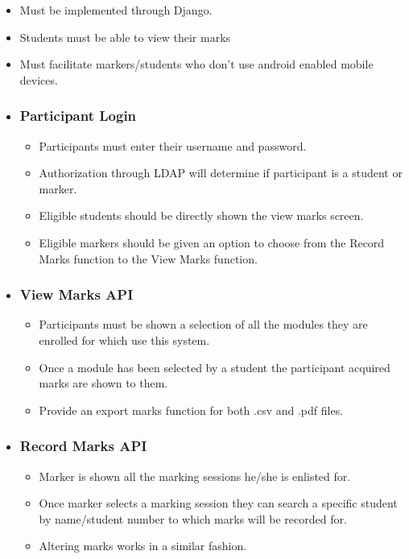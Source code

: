 \documentclass[10pt,a4paper]{article}
\begin{document}
	\begin{itemize}
		\item Must be implemented through Django.
  		\item Students must be able to view their marks
  		\item Must facilitate markers/students who don't use android enabled mobile devices.
  		
		\item \subsubsection*{Participant Login}
		\begin{itemize}
			\item Participants must enter their username and password.
			\item Authorization through LDAP will determine if participant is a student or marker. 
			\item Eligible students should be directly shown the view marks screen.
			\item Eligible markers should be given an option to choose from the Record Marks function to the View Marks function.
		\end{itemize}
		
		\item \subsubsection*{View Marks API}
		\begin{itemize}
			\item Participants must be shown a selection of all the modules they are enrolled for which use this system. 
			\item Once a module has been selected by a student the participant acquired marks are shown to them.
			\item Provide an export marks function for both .csv and .pdf files.
		\end{itemize}
		
		\item \subsubsection*{Record Marks API}
		\begin{itemize}
			\item Marker is shown all the marking sessions he/she is enlisted for.
			\item Once marker selects a marking session they can search a specific student by name/student number to which marks will be recorded for.
			\item Altering marks works in a similar fashion.
		\end{itemize}
	\end{itemize}
	
\end{document}
